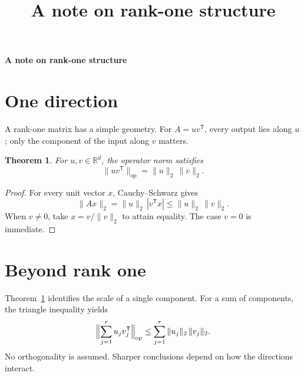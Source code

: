 \documentclass[11pt,a5paper]{article}
\title{A note on rank-one structure}
\author{}\date{}
\newtheorem{theorem}{Theorem}
\begin{document}
\begin{center}{\Large\bfseries A note on rank-one structure}\end{center}
\section{One direction}
A rank-one matrix has a simple geometry.
For $A=uv^{\mathsf T}$, every output lies along $u$;
only the component of the input along $v$ matters.

\begin{theorem}\label{thm:rank-one}
For $u,v\in\mathbb R^d$, the operator norm satisfies
\[\|uv^{\mathsf T}\|_{\mathrm{op}}=\|u\|_2\,\|v\|_2.\]
\end{theorem}
\begin{proof}
For every unit vector $x$, Cauchy--Schwarz gives
\[\|Ax\|_2=\|u\|_2\,|v^{\mathsf T}x|
  \leq\|u\|_2\,\|v\|_2.\]
When $v\ne0$, take $x=v/\|v\|_2$ to attain equality.
The case $v=0$ is immediate.
\end{proof}

\section{Beyond rank one}
Theorem~\ref{thm:rank-one} identifies the scale of a single component.
For a sum of components, the triangle inequality yields
\[\Bigl\|\sum_{j=1}^r u_jv_j^{\mathsf T}\Bigr\|_{\mathrm{op}}
 \leq\sum_{j=1}^r\|u_j\|_2\,\|v_j\|_2.\]
No orthogonality is assumed. Sharper conclusions
depend on how the directions interact.
\end{document}
